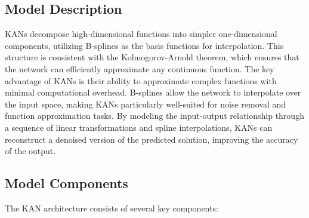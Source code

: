 \documentclass[conference]{IEEEtran}
\begin{document}
\subsection{Model Description}
KANs decompose high-dimensional functions into simpler one-dimensional components, utilizing B-splines as the basis functions for interpolation. This structure is consistent with the Kolmogorov-Arnold theorem, which ensures that the network can efficiently approximate any continuous function. The key advantage of KANs is their ability to approximate complex functions with minimal computational overhead. B-splines allow the network to interpolate over the input space, making KANs particularly well-suited for noise removal and function approximation tasks. By modeling the input-output relationship through a sequence of linear transformations and spline interpolations, KANs can reconstruct a denoised version of the predicted solution, improving the accuracy of the output.

\subsection{Model Components}
The KAN architecture consists of several key components:
\end{document}
